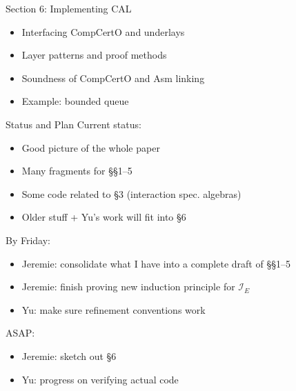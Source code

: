 \documentclass[aspectratio=1610,mathserif]{beamer}
\begin{document}
\begin{frame}{Section 6: Implementing CAL}
  \begin{itemize}
    \item Interfacing CompCertO and underlays
    \item Layer patterns and proof methods
    \item Soundness of CompCertO and Asm linking
    \item Example: bounded queue
  \end{itemize}
\end{frame}

\begin{frame}{Status and Plan}
  Current status:
  \begin{itemize}
    \item Good picture of the whole paper
    \item Many fragments for \S\S 1--5
    \item Some code related to \S 3 (interaction spec. algebras)
    \item Older stuff + Yu's work will fit into \S 6
  \end{itemize}

  By Friday:
  \begin{itemize}
    \item Jeremie: consolidate what I have into a complete draft of \S\S 1--5
    \item Jeremie: finish proving new induction principle for $\mathcal{I}_E$
    \item Yu: make sure refinement conventions work
  \end{itemize}

  ASAP:
  \begin{itemize}
    \item Jeremie: sketch out \S 6
    \item Yu: progress on verifying actual code
  \end{itemize}
\end{frame}
\end{document}
